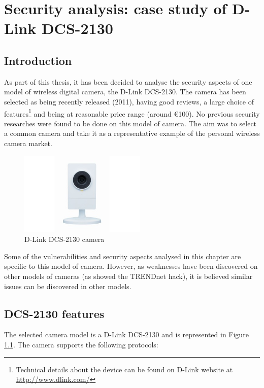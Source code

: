 \chapter{Security analysis: case study of D-Link DCS-2130}
\label{chap:cam-dcs}

\section*{Introduction}
\label{sec:dcs-intro}

As part of this thesis, it has been decided to analyse the security aspects of one model of wireless digital camera, the D-Link DCS-2130.
The camera has been selected as being recently released (2011), having good reviews, a large choice of features\footnote{Technical details about the device can be found on D-Link website at \url{http://www.dlink.com/}} and being at reasonable price range (around €100).
No previous security researches were found to be done on this model of camera.
The aim was to select a common camera and take it as a representative example of the personal wireless camera market.\\

\begin{figure}[h]
  \centering
  \includegraphics[width=6cm]{images/dcs2130.png}
  \caption{D-Link DCS-2130 camera}
  \label{fig:dcs2130}
\end{figure}

Some of the vulnerabilities and security aspects analysed in this chapter are specific to this model of camera.
However, as weaknesses have been discovered on other models of cameras (as showed the TRENDnet hack), it is believed similar issues can be discovered in other models.\\

\section{DCS-2130 features}
\label{sec:dcs-pres}

The selected camera model is a D-Link DCS-2130 and is represented in Figure \ref{fig:dcs2130}. The camera supports the following protocols:\\


